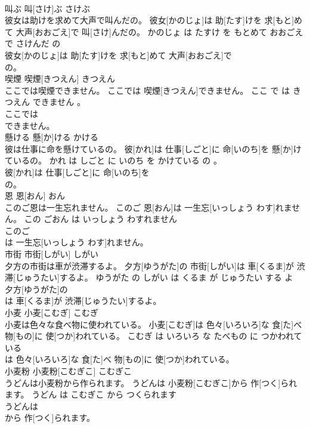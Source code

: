 \documentclass[8pt]{extreport}
\begin{document}
\begin{CJK}{UTF8}{min}
\\	叫ぶ	叫[さけ]ぶ	さけぶ	
\\	彼女は助けを求めて大声で叫んだの。	彼女[かのじょ]は 助[たす]けを 求[もと]めて 大声[おおごえ]で 叫[さけ]んだの。	かのじょ は たすけ を もとめて おおごえ で さけんだ の	
\\	彼女[かのじょ]は 助[たす]けを 求[もと]めて 大声[おおごえ]で
\\	の。			
\\	喫煙	喫煙[きつえん]	きつえん	
\\	ここでは喫煙できません。	ここでは 喫煙[きつえん]できません。	ここ で は きつえん できません 。	
\\	ここでは
\\	できません。			
\\	懸ける	懸[か]ける	かける	
\\	彼は仕事に命を懸けているの。	彼[かれ]は 仕事[しごと]に 命[いのち]を 懸[か]けているの。	かれ は しごと に いのち を かけている の 。	
\\	彼[かれ]は 仕事[しごと]に 命[いのち]を
\\	の。			
\\	恩	恩[おん]	おん	
\\	このご恩は一生忘れません。	このご 恩[おん]は 一生忘[いっしょう わす]れません。	この ごおん は いっしょう わすれません	
\\	このご
\\	は 一生忘[いっしょう わす]れません。			
\\	市街	市街[しがい]	しがい	
\\	夕方の市街は車が渋滞するよ。	夕方[ゆうがた]の 市街[しがい]は 車[くるま]が 渋滞[じゅうたい]するよ。	ゆうがた の しがい は くるま が じゅうたい する よ	
\\	夕方[ゆうがた]の
\\	は 車[くるま]が 渋滞[じゅうたい]するよ。			
\\	小麦	小麦[こむぎ]	こむぎ	
\\	小麦は色々な食べ物に使われている。	小麦[こむぎ]は 色々[いろいろ]な 食[た]べ 物[もの]に 使[つか]われている。	こむぎ は いろいろ な たべもの に つかわれて いる	
\\	は 色々[いろいろ]な 食[た]べ 物[もの]に 使[つか]われている。			
\\	小麦粉	小麦粉[こむぎこ]	こむぎこ	
\\	うどんは小麦粉から作られます。	うどんは 小麦粉[こむぎこ]から 作[つく]られます。	うどん は こむぎこ から つくられます	
\\	うどんは
\\	から 作[つく]られます。			

\end{CJK}
\end{document}
